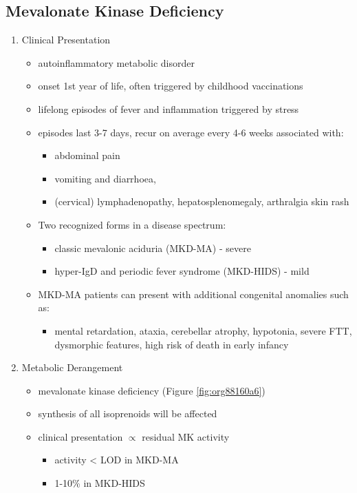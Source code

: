 \documentclass{scrartcl}
\begin{document}
\subsection{Mevalonate Kinase Deficiency}
\label{sec:org9eacc02}
\begin{enumerate}
\item Clinical Presentation
\label{sec:orgba1a33d}
\begin{itemize}
\item autoinflammatory metabolic disorder
\item onset 1st year of life, often triggered by childhood vaccinations
\item lifelong episodes of fever and inflammation triggered by stress
\item episodes last 3-7 days, recur on average every 4-6 weeks associated with:
\begin{itemize}
\item abdominal pain
\item vomiting and diarrhoea,
\item (cervical) lymphadenopathy, hepatosplenomegaly, arthralgia skin rash
\end{itemize}
\item Two recognized forms in a disease spectrum:
\begin{itemize}
\item classic mevalonic aciduria (MKD-MA) - severe
\item hyper-IgD and periodic fever syndrome (MKD-HIDS) - mild
\end{itemize}

\item MKD-MA patients can present with additional congenital anomalies
such as:
\begin{itemize}
\item mental retardation, ataxia, cerebellar atrophy, hypotonia, severe
FTT, dysmorphic features, high risk of death in early infancy
\end{itemize}
\end{itemize}

\item Metabolic Derangement
\label{sec:orged524ff}
\begin{itemize}
\item mevalonate kinase deficiency (Figure \ref{fig:org88160a6})
\end{itemize}
\begin{itemize}
\item synthesis of all isoprenoids will be affected
\item clinical presentation \(\propto\) residual MK activity
\begin{itemize}
\item activity < LOD in MKD-MA
\item 1-10\% in MKD-HIDS
\end{itemize}
\end{itemize}


\end{enumerate}
\end{document}
